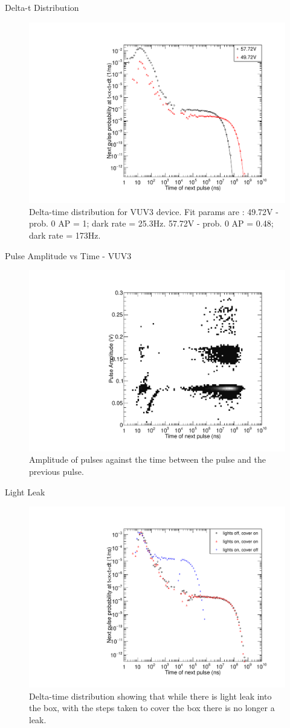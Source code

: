 \documentclass{beamer}
\begin{document}
\begin{frame}{Delta-t Distribution}
\begin{figure}
\centering
\includegraphics[height=0.5\textwidth]{DTVUV3.pdf}
\caption{Delta-time distribution for VUV3 device. Fit params are : 49.72V - prob. 0 AP = 1; dark rate = 25.3Hz. 57.72V - prob. 0 AP = 0.48; dark rate = 173Hz.}
\end{figure}
\end{frame}

\begin{frame}{Pulse Amplitude vs Time - VUV3}
\begin{figure}
\centering
\includegraphics[height=0.5\textwidth]{AmpVUV3.pdf}
\caption{Amplitude of pulses against the time between the pulse and the previous pulse.}
\end{figure}
\end{frame}

\begin{frame}{Light Leak}
\begin{figure}
\centering
\includegraphics[height=0.5\textwidth]{LightLeak.pdf}
\caption{Delta-time distribution showing that while there is light leak into the box, with the steps taken to cover the box there is no longer a leak.}
\end{figure}
\end{frame}
\end{document}
